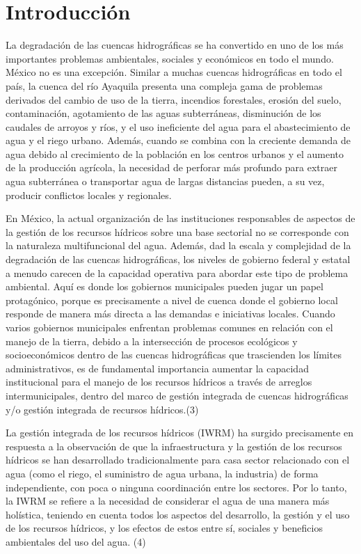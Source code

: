 \section{Introducción}
    La degradación de las cuencas hidrográficas se ha convertido en uno de los más importantes problemas ambientales, sociales y económicos en todo el mundo. México no es una excepción. Similar a muchas cuencas hidrográficas en todo el país, la cuenca del río Ayaquila presenta una compleja gama de problemas derivados del cambio de uso de la tierra, incendios forestales, erosión del suelo, contaminación, agotamiento de las aguas subterráneas, disminución de los caudales de arroyos y ríos, y el uso ineficiente del agua para el abastecimiento de agua y el riego urbano. Además, cuando se combina con la creciente demanda de agua debido al crecimiento de la población en los centros urbanos y el aumento de la producción agrícola, la necesidad de perforar más profundo para extraer agua subterránea o transportar agua de largas distancias pueden, a su vez, producir conflictos locales y regionales.

    En México, la actual organización de las instituciones responsables de aspectos de la gestión de los recursos hídricos sobre una base sectorial no se corresponde con la naturaleza multifuncional del agua. Además, dad la escala y complejidad de la degradación de las cuencas hidrográficas, los niveles de gobierno federal y estatal a menudo carecen de la capacidad operativa para abordar este tipo de problema ambiental. Aquí es donde los gobiernos municipales pueden jugar un papel protagónico, porque es precisamente a nivel de cuenca donde el gobierno local responde de manera más directa a las demandas e iniciativas locales. Cuando varios gobiernos municipales enfrentan problemas comunes en relación con el manejo de la tierra, debido a la intersección de procesos ecológicos y socioeconómicos dentro de las cuencas hidrográficas que trascienden los límites administrativos, es de fundamental importancia aumentar la capacidad institucional para el manejo de los recursos hídricos a través de arreglos intermunicipales, dentro del marco de gestión integrada de cuencas hidrográficas y/o gestión integrada de recursos hídricos.(3)

    La gestión integrada de los recursos hídricos (IWRM) ha surgido precisamente en respuesta a la observación de que la infraestructura y la gestión de los recursos hídricos se han desarrollado tradicionalmente para casa sector relacionado con el agua (como el riego, el suministro de agua urbana, la industria) de forma independiente, con poca o ninguna coordinación entre los sectores. Por lo tanto, la IWRM se refiere a la necesidad de considerar el agua de una manera más holística, teniendo en cuenta todos los aspectos del desarrollo, la gestión y el uso de los recursos hídricos, y los efectos de estos entre sí, sociales y beneficios ambientales del uso del agua. (4)

